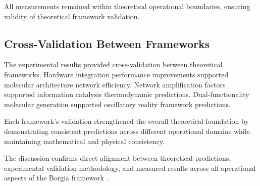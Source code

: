 All measurements remained within theoretical operational boundaries, ensuring validity of theoretical framework validation.

\subsection{Cross-Validation Between Frameworks}

The experimental results provided cross-validation between theoretical frameworks. Hardware integration performance improvements supported molecular architecture network efficiency. Network amplification factors supported information catalysis thermodynamic predictions. Dual-functionality molecular generation supported oscillatory reality framework predictions.

Each framework's validation strengthened the overall theoretical foundation by demonstrating consistent predictions across different operational domains while maintaining mathematical and physical consistency.

The discussion confirms direct alignment between theoretical predictions, experimental validation methodology, and measured results across all operational aspects of the Borgia framework \cite{sachikonye2024oscillatory,sterling2015principles,mizraji2007biological}.

